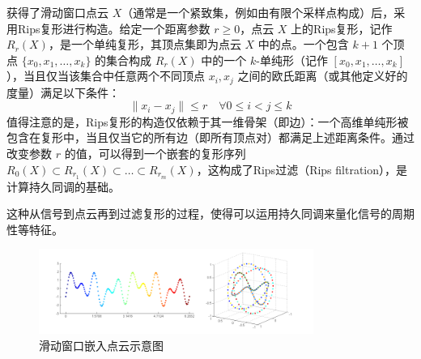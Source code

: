 获得了滑动窗口点云 $X$（通常是一个紧致集，例如由有限个采样点构成）后，采用Rips复形进行构造。给定一个距离参数 $r \ge 0$，点云 $X$ 上的Rips复形，记作 $R_r(X)$，是一个单纯复形，其顶点集即为点云 $X$ 中的点。一个包含 $k+1$ 个顶点 $\{x_0, x_1, \ldots, x_k\}$ 的集合构成 $R_r(X)$ 中的一个 $k$-单纯形（记作 $[x_0, x_1, \ldots, x_k]$），当且仅当该集合中任意两个不同顶点 $x_i, x_j$ 之间的欧氏距离（或其他定义好的度量）满足以下条件：
\begin{equation}
\|x_i - x_j\| \leq r \quad \forall 0 \leq i < j \leq k
\end{equation}
值得注意的是，Rips复形的构造仅依赖于其一维骨架（即边）：一个高维单纯形被包含在复形中，当且仅当它的所有边（即所有顶点对）都满足上述距离条件。通过改变参数 $r$ 的值，可以得到一个嵌套的复形序列 $R_0(X) \subset R_{r_1}(X) \subset \ldots \subset R_{r_m}(X)$，这构成了Rips过滤（Rips filtration），是计算持久同调的基础。

这种从信号到点云再到过滤复形的过程，使得可以运用持久同调来量化信号的周期性等特征。

\begin{figure}[thbp!]
    \centering
    \includegraphics[width=0.8\textwidth]{figure/滑动窗口嵌入示意图、.png}
    \caption{滑动窗口嵌入点云示意图}
\end{figure}

